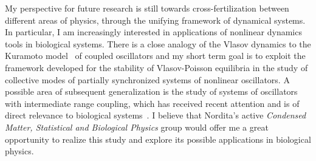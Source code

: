 \documentclass[a4paper,10pt]{article}
\begin{document}
My perspective for future research is still towards cross-fertilization
between different areas of physics, through the unifying framework of
dynamical systems. In particular, I am increasingly interested in applications
of nonlinear dynamics tools in biological systems.
There is a close analogy of the Vlasov dynamics to the Kuramoto model~\cite{strogatz00} 
of coupled oscillators and my short term goal is to exploit the
framework developed for the stability of Vlasov-Poisson equilibria 
in the study of collective modes of partially synchronized systems 
of nonlinear oscillators. A possible area of subsequent generalization is the study
of systems of oscillators with intermediate range coupling, which has
received recent attention and is of direct 
relevance to biological systems~\cite{martens10,motter10}.
I believe that Nordita's active \emph{Condensed Matter, Statistical 
and Biological Physics}
group would offer me a great opportunity to realize this study and explore
its possible applications in biological physics.






\end{document}
